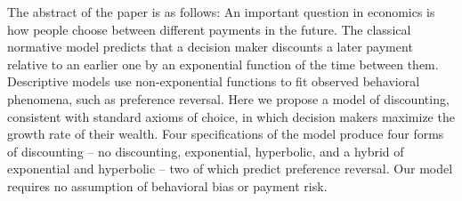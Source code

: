 
The abstract of the paper is as follows: An important question in economics is how people choose between different payments in the future. The classical normative model predicts that a decision maker discounts a later payment relative to an earlier one by an exponential function of the time between them. Descriptive models use non-exponential functions to fit observed behavioral phenomena, such as preference reversal. Here we propose a model of discounting, consistent with standard axioms of choice, in which decision makers maximize the growth rate of their wealth. Four specifications of the model produce four forms of discounting -- no discounting, exponential, hyperbolic, and a hybrid of exponential and hyperbolic -- two of which predict preference reversal. Our model requires no assumption of behavioral bias or payment risk.






